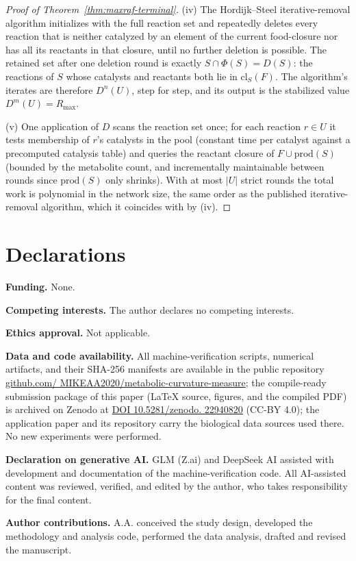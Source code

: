\documentclass[11pt,a4paper]{article}
\theoremstyle{plain}
\theoremstyle{definition}
\theoremstyle{remark}
\begin{document}
\begin{proof}[Proof of Theorem~\ref{thm:maxraf-terminal}]
(iv) The Hordijk--Steel iterative-removal algorithm initializes
with the full reaction set and repeatedly deletes every reaction
that is neither catalyzed by an element of the current food-closure
nor has all its reactants in that closure, until no further
deletion is possible. The retained set after one deletion round is
exactly $S\cap\Phi(S)=D(S)$: the reactions of $S$ whose catalysts
and reactants both lie in $\mathrm{cl}_{S}(F)$. The algorithm's iterates are therefore
$D^{n}(U)$, step for step, and its output is the stabilized
value $D^{m}(U)=R_{\max}$.

(v) One application of $D$ scans the reaction set once; for each
reaction $r\in U$ it tests membership of $r$'s catalysts in the
pool (constant time per catalyst against a precomputed catalysis
table) and queries the reactant closure of
$F\cup\mathrm{prod}(S)$ (bounded by the metabolite count, and
incrementally maintainable between rounds since
$\mathrm{prod}(S)$ only shrinks). With at most $|U|$ strict
rounds the total work is polynomial in the network size, the same
order as the published iterative-removal algorithm, which it
coincides with by (iv).
\end{proof}

\section*{Declarations}
\noindent\textbf{Funding.} None.

\smallskip
\noindent\textbf{Competing interests.} The author declares no
competing interests.

\smallskip
\noindent\textbf{Ethics approval.} Not applicable.

\smallskip
\noindent\textbf{Data and code availability.} All
machine-verification scripts, numerical artifacts, and their SHA-256
manifests are available in the public repository
\href{https://github.com/MIKEAA2020/metabolic-curvature-measure}{github.com/
MIKEAA2020/metabolic-curvature-measure}; the compile-ready
submission package of this paper (LaTeX source, figures, and the
compiled PDF) is archived on Zenodo at
\href{https://doi.org/10.5281/zenodo.22940820}{DOI 10.5281/zenodo.
22940820} (CC-BY 4.0); the application paper
\citep{zai2026measure} and its repository carry the biological data
sources used there. No new experiments were performed.

\smallskip
\noindent\textbf{Declaration on generative AI.} GLM (Z.ai) and
DeepSeek AI assisted with development and documentation of the
machine-verification code. All AI-assisted content was reviewed,
verified, and edited by the author, who takes responsibility for the
final content.

\smallskip
\noindent\textbf{Author contributions.} A.A. conceived the study
design, developed the methodology and analysis code, performed the
data analysis, drafted and revised the manuscript.



\end{document}
